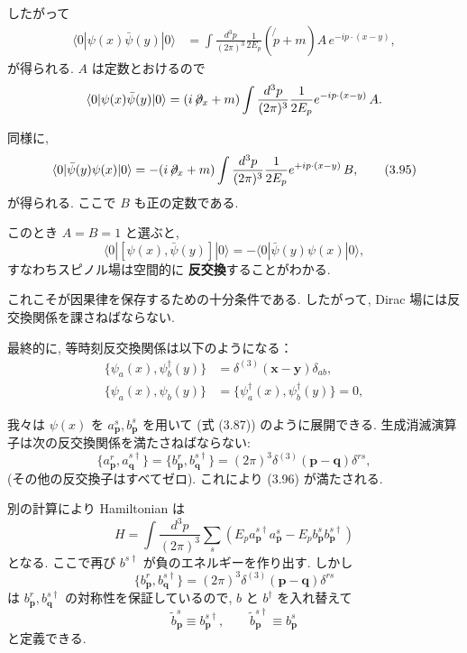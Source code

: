 \documentclass[a4paper,12pt]{article}
\begin{document}
したがって
\begin{align}
\langle 0|\psi(x)\bar{\psi}(y)|0\rangle
&= \int \frac{d^3p}{(2\pi)^3}\frac{1}{2E_p} (\not{p}+m) A \, e^{-ip\cdot(x-y)},
\end{align}
が得られる. $A$ は定数とおけるので
\begin{equation}
\langle 0|\psi(x)\bar{\psi}(y)|0\rangle = (i\!\not\!\partial_x+m) \int \frac{d^3p}{(2\pi)^3}\frac{1}{2E_p} e^{-ip\cdot(x-y)} \, A .
\end{equation}

同様に,
\begin{equation}
\langle 0|\bar{\psi}(y)\psi(x)|0\rangle 
= - (i\!\not\!\partial_x+m) \int \frac{d^3p}{(2\pi)^3}\frac{1}{2E_p} e^{+ip\cdot(x-y)} \, B ,
\tag{3.95}
\end{equation}
が得られる. ここで $B$ も正の定数である.

このとき $A=B=1$ と選ぶと,
\begin{equation}
\langle 0|[\psi(x),\bar{\psi}(y)]|0\rangle = - \langle 0|\bar{\psi}(y)\psi(x)|0\rangle ,
\end{equation}
すなわちスピノル場は空間的に \textbf{反交換}することがわかる.

これこそが因果律を保存するための十分条件である. したがって, Dirac 場には反交換関係を課さねばならない.  

最終的に, 等時刻反交換関係は以下のようになる：
\begin{align}
\{\psi_a(x), \psi_b^\dagger(y)\} &= \delta^{(3)}(\mathbf{x}-\mathbf{y})\delta_{ab}, \\
\{\psi_a(x), \psi_b(y)\} &= \{\psi_a^\dagger(x), \psi_b^\dagger(y)\} = 0 ,
\tag{3.96}
\end{align}

我々は $\psi(x)$ を $a^s_{\mathbf{p}}, b^s_{\mathbf{p}}$ を用いて (式 (3.87)) のように展開できる.  
生成消滅演算子は次の反交換関係を満たさねばならない:
\begin{equation}
\{a^r_{\mathbf{p}}, a^{s\dagger}_{\mathbf{q}}\} = \{b^r_{\mathbf{p}}, b^{s\dagger}_{\mathbf{q}}\}
= (2\pi)^3 \delta^{(3)}(\mathbf{p}-\mathbf{q})\delta^{rs},
\tag{3.97}
\end{equation}
(その他の反交換子はすべてゼロ). これにより (3.96) が満たされる.  

別の計算により Hamiltonian は
\begin{equation}
H = \int \frac{d^3p}{(2\pi)^3} \sum_s \left( E_p a^{s\dagger}_{\mathbf{p}} a^s_{\mathbf{p}}
- E_p b^s_{\mathbf{p}} b^{s\dagger}_{\mathbf{p}} \right)
\end{equation}
となる. ここで再び $b^{s\dagger}$ が負のエネルギーを作り出す. しかし
\begin{equation}
\{b^r_{\mathbf{p}}, b^{s\dagger}_{\mathbf{q}}\} = (2\pi)^3 \delta^{(3)}(\mathbf{p}-\mathbf{q}) \delta^{rs}
\end{equation}
は $b^r_{\mathbf{p}}, b^{s\dagger}_{\mathbf{q}}$ の対称性を保証しているので, $b$ と $b^\dagger$ を入れ替えて
\begin{equation}
\tilde{b}^s_{\mathbf{p}} \equiv b^{s\dagger}_{\mathbf{p}}, \qquad \tilde{b}^{s\dagger}_{\mathbf{p}} \equiv b^s_{\mathbf{p}}
\tag{3.98}
\end{equation}
と定義できる.  
\end{document}
